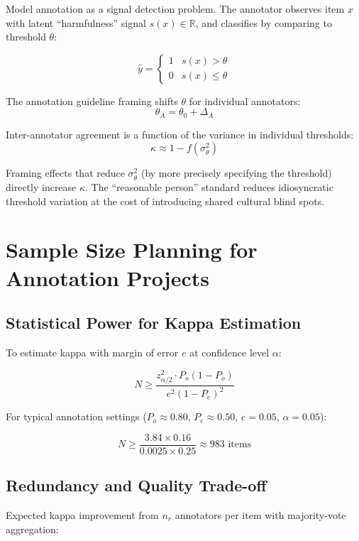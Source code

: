 Model annotation as a signal detection problem. The annotator observes item $x$ with latent ``harmfulness'' signal $s(x) \in \mathbb{R}$, and classifies by comparing to threshold $\theta$:

\[
\hat{y} = \begin{cases} 1 & s(x) > \theta \\ 0 & s(x) \leq \theta \end{cases}
\]

The annotation guideline framing shifts $\theta$ for individual annotators:
\[
\theta_A = \theta_0 + \Delta_A
\]

Inter-annotator agreement is a function of the variance in individual thresholds:
\[
\kappa \approx 1 - f(\sigma_\theta^2)
\]

Framing effects that reduce $\sigma_\theta^2$ (by more precisely specifying the threshold) directly increase $\kappa$. The ``reasonable person'' standard reduces idiosyncratic threshold variation at the cost of introducing shared cultural blind spots.

\section{Sample Size Planning for Annotation Projects}

\subsection{Statistical Power for Kappa Estimation}
\label{sec:ch07-power}

To estimate kappa with margin of error $e$ at confidence level $\alpha$:

\[
N \geq \frac{z_{\alpha/2}^2 \cdot P_o(1-P_o)}{e^2 (1-P_e)^2}
\]

For typical annotation settings ($P_o \approx 0.80$, $P_e \approx 0.50$, $e = 0.05$, $\alpha = 0.05$):

\[
N \geq \frac{3.84 \times 0.16}{0.0025 \times 0.25} \approx 983 \text{ items}
\]

\subsection{Redundancy and Quality Trade-off}

Expected kappa improvement from $n_r$ annotators per item with majority-vote aggregation:

